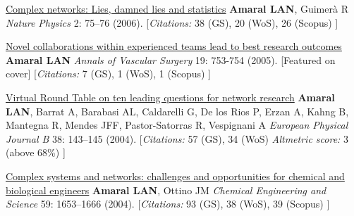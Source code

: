 \NumberedItem{\makebox[0.8cm][r]{[4]}}
\href{/people/amaral/lies-damned-lies-and-statistics}
{Complex networks: Lies, damned lies and statistics}
\newline
{\textbf{Amaral LAN}}, Guimer\`a R
\newline
\textit{Nature Physics}
    2:
75--76 (2006).
    \newline
    \hfill [{\em{Citations:}} 38 (GS),
    20 (WoS), 26 (Scopus)
    ]
\newline
\Gap
~
\Gap

\NumberedItem{\makebox[0.8cm][r]{[3]}}
\href{/people/amaral/novel-collaborations-within-experienced-teams-lead-to-best-research-outcomes}
{Novel collaborations within experienced teams lead to best research outcomes}
\newline
{\textbf{Amaral LAN}}
\newline
\textit{Annals of Vascular Surgery}
    19:
753-754 (2005).
    [Featured on cover]
    \newline
    \hfill [{\em{Citations:}} 7 (GS),
    1 (WoS), 1 (Scopus)
    ]
\newline
\Gap
~
\Gap

\NumberedItem{\makebox[0.8cm][r]{[2]}}
\href{False}
{Virtual Round Table on ten leading questions for network research}
\newline
{\textbf{Amaral LAN}}, Barrat A, Barabasi AL, Caldarelli G, De los Rios P, Erzan A, Kahng B, Mantegna R, Mendes JFF, Pastor-Satorras R, Vespignani A 
\newline
\textit{European Physical Journal B}
    38:
143--145  (2004).
    \newline
    \hfill [{\em{Citations:}} 57 (GS),
    34 (WoS)
        {\hspace*{1cm} \em{Altmetric score:}}  3 (above 68\%)
    ]
\newline
\Gap
~
\Gap

\NumberedItem{\makebox[0.8cm][r]{[1]}}
\href{/people/amaral/complex-systems-and-networks-challenges-and-opportunities-for-chemical-and-biological-engineers}
{Complex systems and networks: challenges and opportunities for chemical and biological engineers}
\newline
{\textbf{Amaral LAN}}, Ottino JM
\newline
\textit{Chemical Engineering and Science}
    59:
1653--1666 (2004).
    \newline
    \hfill [{\em{Citations:}} 93 (GS),
    38 (WoS), 39 (Scopus)
    ]
\newline
\Gap
~
\Gap

